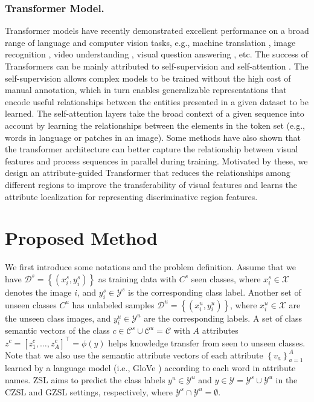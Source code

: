\documentclass[letterpaper]{article} %
\begin{document}
	\subsubsection{Transformer Model.}\label{sec2.2} Transformer models \cite{Vaswani2017AttentionIA} have recently demonstrated excellent performance on a broad range of language and computer vision tasks, e.g., machine translation \cite{Ott2018ScalingNM}, image recognition \cite{Dosovitskiy2021AnII}, video understanding \cite{Gabeur2020MultimodalTF}, visual question answering \cite{ZhangRSTNetCW}, etc. The success of Transformers can be mainly attributed to self-supervision and self-attention \cite{Khan2021TransformersIV}. The self-supervision allows complex models to be trained without the high cost of manual annotation, which in turn enables generalizable representations that encode useful relationships between the entities presented in a given dataset to be learned. The self-attention layers take the broad context of a given sequence into account by learning the relationships between the elements in the token set  (e.g., words in language or patches in an image). Some methods \cite{Gabeur2020MultimodalTF,Cornia2020MeshedMemoryTF,Huang2019AttentionOA,Pan2020XLinearAN} have also shown that the transformer architecture can better capture the relationship between visual features and process sequences in parallel during training. Motivated by these, we design an attribute-guided Transformer that reduces the relationships among different regions to improve the transferability of visual features and learns the attribute localization for representing discriminative region features. 
	
	
	
	
	\section{Proposed Method}\label{sec3}
	We first introduce some notations and the problem definition. Assume that we have $\mathcal{D}^{s}=\left\{\left(x_{i}^{s}, y_{i}^{s}\right)\right\}$ as training data with $C^s$ seen classes, where $x_i^s \in \mathcal{X}$ denotes the image $i$, and $y_i^s \in \mathcal{Y}^s$ is the corresponding class label. Another set of unseen classes $C^u$ has unlabeled samples $\mathcal{D}^{u}=\left\{\left(x_{i}^{u}, y_{i}^{u}\right)\right\}$, where $x_{i}^{u}\in \mathcal{X}$ are the unseen class images, and $y_{i}^{u} \in \mathcal{Y}^u$ are the corresponding labels. A set of class semantic vectors of the class $c \in \mathcal{C}^{s} \cup \mathcal{C}^{u} = \mathcal{C}$ with $A$ attributes $z^{c}=\left[z_{1}^{c}, \ldots, z_{A}^{c}\right]^{\top}= \phi(y)$ helps knowledge transfer from seen to unseen classes.  Note that we also use the semantic attribute vectors of each attribute $\left\{v_{a}\right\}_{a=1}^{A}$ learned by a language model (i.e., GloVe  \cite{Pennington2014GloveGV}) according to each word in attribute names. ZSL aims to predict the class labels $y^u \in \mathcal{Y}^u$ and $y \in \mathcal{Y}=\mathcal{Y}^{s} \cup \mathcal{Y}^{u}$ in the CZSL and GZSL settings, respectively, where $\mathcal{Y}^{s} \cap \mathcal{Y}^{u}=\emptyset$.
	
\end{document}
